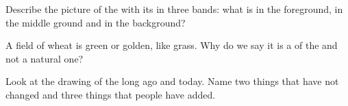\begin{exercise}[$\star\star$]\label{exo:g1:landscapes-around-us:9}
Describe the picture of the  with its  in three bands: what is
in the foreground, in the middle ground and in the background?
\end{exercise}

\begin{exercise}[$\star\star$]\label{exo:g1:landscapes-around-us:10}
A field of wheat is green or golden, like grass. Why do we say it is a
 of the  and not a natural one?
\end{exercise}

\begin{exercise}[$\star\star$]\label{exo:g1:landscapes-around-us:11}
Look at the drawing of the  long ago and today. Name two things that
have not changed and three things that people have added.
\end{exercise}
